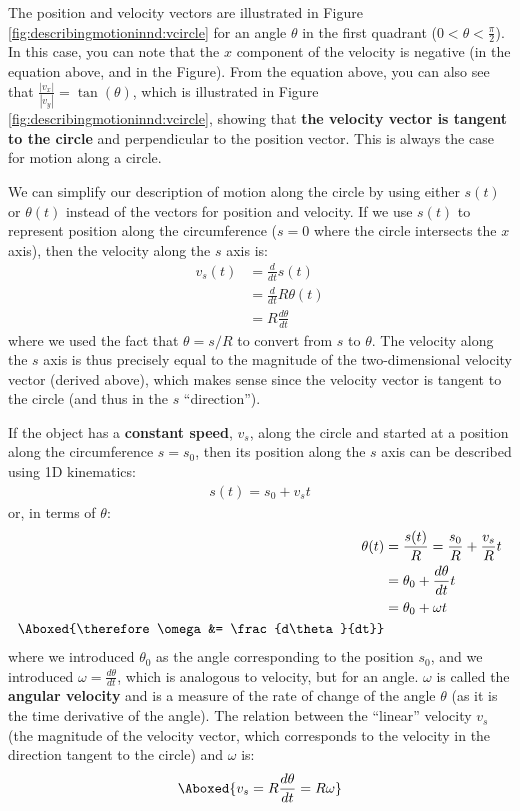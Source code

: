 The position and velocity vectors are illustrated in Figure \ref{fig:describingmotioninnd:vcircle} for an angle $\theta$ in the first quadrant ($0<\theta<\frac{\pi}{2}$).
In this case, you can note that the $x$ component of the velocity is negative (in the equation above, and in the Figure). From the equation above, you can also see that $\frac{|v_x|}{|v_y|}=\tan(\theta)$, which is illustrated in Figure \ref{fig:describingmotioninnd:vcircle}, showing that \textbf{the velocity vector is tangent to the circle} and perpendicular to the position vector. This is always the case for motion along a circle.

We can simplify our description of motion along the circle by using either $s(t)$ or $\theta(t)$ instead of the vectors for position and velocity. If we use $s(t)$ to represent position along the circumference ($s=0$ where the circle intersects the $x$ axis), then the velocity along the $s$ axis is:
\begin{align*}
v_s(t)&=\frac{d}{dt}s(t)\\
&=\frac{d}{dt}R\theta(t)\\
&=R\frac{d\theta}{dt}
\end{align*}
where we used the fact that $\theta=s/R$ to convert from $s$ to $\theta$. The velocity along the $s$ axis is thus precisely equal to the magnitude of the two-dimensional velocity vector (derived above), which makes sense since the velocity vector is tangent to the circle (and thus in the $s$ ``direction'').

If the object has a \textbf{constant speed}, $v_s$, along the circle and started at a position along the circumference $s=s_0$, then its position along the $s$ axis can be described using 1D kinematics:
\begin{align*}
s(t)=s_0+v_st
\end{align*}
or, in terms of $\theta$:
\begin{align*}
\theta(t)&=\frac{s(t)}{R}=\frac{s_0}{R}+\frac{v_s}{R}t\\
&=\theta_0 + \frac{d\theta}{dt}t\\
&=\theta_0 + \omega t\\
\Aboxed{\therefore \omega &= \frac{d\theta}{dt}}
\end{align*}
where we introduced $\theta_0$ as the angle corresponding to the position $s_0$, and we introduced $\omega=\frac{d\theta}{dt}$, which is analogous to velocity, but for an angle. $\omega$ is called the \textbf{angular velocity} and is a measure of the rate of change of the angle $\theta$ (as it is the time derivative of the angle). The relation between the ``linear'' velocity $v_s$ (the magnitude of the velocity vector, which corresponds to the velocity in the direction tangent to the circle) and $\omega$ is:
\begin{align*}
\Aboxed{v_s=R\frac{d\theta}{dt}=R\omega }
\end{align*}

